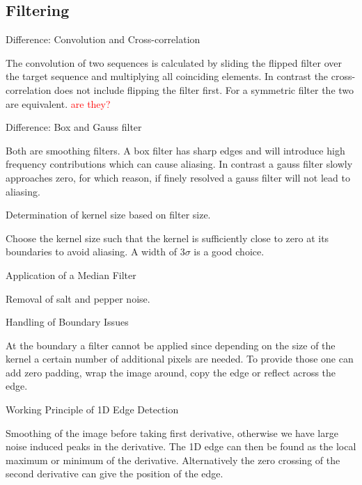 \documentclass[10pt,a4paper]{scrartcl}
\begin{document}
\begin{multicols*}{2}
\subsection*{Filtering}

\begin{QandA}{Difference: Convolution and Cross-correlation}
\item The convolution of two sequences is calculated by sliding the flipped filter over the target sequence and multiplying all coinciding elements. In contrast the cross-correlation does not include flipping the filter first. For a symmetric filter the two are equivalent. \textcolor{red}{are they?}
\end{QandA}

\begin{QandA}{Difference: Box and Gauss filter}
\item Both are smoothing filters. A box filter has sharp edges and will introduce high frequency contributions which can cause aliasing. In contrast a gauss filter slowly approaches zero, for which reason, if finely resolved a gauss filter will not lead to aliasing.
\end{QandA}

\begin{QandA}{Determination of kernel size based on filter size.}
\item Choose the kernel size such that the kernel is sufficiently close to zero at its boundaries to avoid aliasing. A width of 3$\sigma$ is a good choice.
\end{QandA}

\begin{QandA}{Application of a Median Filter}
\item Removal of salt and pepper noise.
\end{QandA}

\begin{QandA}{Handling of Boundary Issues}
\item At the boundary a filter cannot be applied since depending on the size of the kernel a certain number of additional pixels are needed. To provide those one can add zero padding, wrap the image around, copy the edge or reflect across the edge.
\end{QandA}

\begin{QandA}{Working Principle of 1D Edge Detection}
\item Smoothing of the image before taking first derivative, otherwise we have large noise induced peaks in the derivative. The 1D edge can then be found as the local maximum or minimum of the derivative. Alternatively the zero crossing of the second derivative can give the position of the edge.
\end{QandA}


\end{multicols*}
\end{document}
